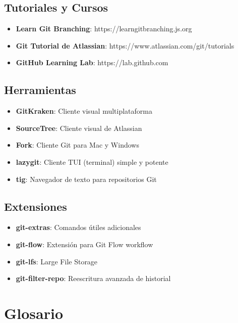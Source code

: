 \documentclass[
  doc,
  floatsintext,
  longtable,
  a4paper,
  nolmodern,
  notxfonts,
  notimes,
  12pt,
  colorlinks=true,linkcolor=blue,citecolor=blue,urlcolor=blue]{apa7}
\providecommand{\tightlist}{%
  \setlength{\itemsep}{0pt}\setlength{\parskip}{0pt}}
\begin{document}
\subsection{Tutoriales y Cursos}\label{tutoriales-y-cursos}

\begin{itemize}
\tightlist
\item
  \textbf{Learn Git Branching}: https://learngitbranching.js.org
\item
  \textbf{Git Tutorial de Atlassian}:
  https://www.atlassian.com/git/tutorials
\item
  \textbf{GitHub Learning Lab}: https://lab.github.com
\end{itemize}

\subsection{Herramientas}\label{herramientas}

\begin{itemize}
\tightlist
\item
  \textbf{GitKraken}: Cliente visual multiplataforma
\item
  \textbf{SourceTree}: Cliente visual de Atlassian
\item
  \textbf{Fork}: Cliente Git para Mac y Windows
\item
  \textbf{lazygit}: Cliente TUI (terminal) simple y potente
\item
  \textbf{tig}: Navegador de texto para repositorios Git
\end{itemize}

\subsection{Extensiones}\label{extensiones}

\begin{itemize}
\tightlist
\item
  \textbf{git-extras}: Comandos útiles adicionales
\item
  \textbf{git-flow}: Extensión para Git Flow workflow
\item
  \textbf{git-lfs}: Large File Storage
\item
  \textbf{git-filter-repo}: Reescritura avanzada de historial
\end{itemize}

\section{Glosario}\label{glosario}
\end{document}
